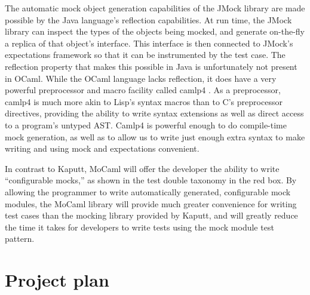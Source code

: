 \documentclass[proposal]{softeng}
\begin{document}
The automatic mock object generation capabilities of the JMock library
are made possible by the Java language's reflection capabilities. At
run time, the JMock library can inspect the types of the objects being
mocked, and generate on-the-fly a replica of that object's
interface. This interface is then connected to JMock's expectations
framework so that it can be instrumented by the test case. The
reflection property that makes this possible in Java is unfortunately
not present in OCaml. While the OCaml language lacks reflection, it
does have a very powerful preprocessor and macro facility called
camlp4 \cite{www:reading_camlp4}. As a preprocessor, camlp4 is much
more akin to Lisp's syntax macros than to C's preprocessor directives,
providing the ability to write syntax extensions as well as direct
access to a program's untyped AST. Camlp4 is powerful enough to do
compile-time mock generation, as well as to allow us to write just
enough extra syntax to make writing and using mock and expectations
convenient.

In contrast to Kaputt, MoCaml will offer the developer the ability to
write ``configurable mocks,'' as shown in the test double taxonomy in
the red box. By allowing the programmer to write automatically
generated, configurable mock modules, the MoCaml library will provide
much greater convenience for writing test cases than the mocking
library provided by Kaputt, and will greatly reduce the time it takes
for developers to write tests using the mock module test pattern.


\section{Project plan}

\end{document}
